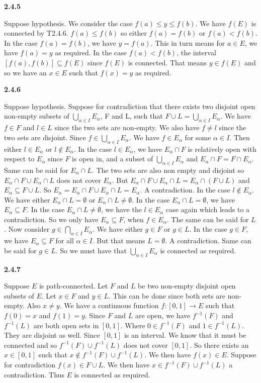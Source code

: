 \documentclass[12pt]{article}
\begin{document}
\textbf{2.4.5}

Suppose hypothesis. We consider the case $f(a) \leq y \leq f(b)$. We have $ f(E)$ is connected by T2.4.6. $f(a) \leq f(b)$ so either $f(a) = f(b)$ or $f(a) < f(b)$. In the case $f(a) = f(b)$, we have $y = f(a)$. This in turn means for $a\in E$, we have $f(a) =y$ as required. In the case $f(a) < f(b)$, the interval $[f(a), f(b)]\subseteq f(E)$ since $f(E)$ is connected. That means $y\in f(E)$ and so we have an $x\in E$ such that $f(x) = y$ as required. 

\textbf{2.4.6}

Suppose hypothesis. Suppose for contradiction that there exists two disjoint open non-empty subsets of $\bigcup_{\alpha\in I}E_\alpha$, F and L, such that $F\cup L=\bigcup_{\alpha\in I}E_\alpha$. We have $f\in F$ and $l\in L$ since the two sets are non-empty. We also have $f\neq l$ since the two sets are disjoint. Since $f\in \bigcup_{\alpha\in I}E_\alpha$. We have $f\in E_\alpha$ for some $\alpha \in I$. Then either $l\in  E_\alpha$ or $l\notin E_\alpha$. In the case $l\in E_\alpha$, we have $ E_\alpha\cap F$ is relatively open with respect to $E_\alpha$ since $F$ is open in, and a subset of $\bigcup_{\alpha\in I}E_\alpha$ and $E_\alpha\cap F = F\cap E_\alpha$. Same can be said for $ E_\alpha \cap L$. The two sets are also non empty and disjoint so $E_\alpha\cap F \cup E_\alpha \cap L$ does not cover $E_\alpha$. But $E_\alpha\cap F \cup E_\alpha \cap L = E_\alpha\cap (F\cup L)$ and $E_\alpha \subseteq F\cup L$. So $E_\alpha = E_\alpha\cap F \cup E_\alpha \cap L = E_\alpha $. A contradiction. In the case $ l\notin E_\alpha$. We have either $E_\alpha \cap L= \emptyset$ or $E_\alpha \cap L\neq\emptyset$. In the case $E_\alpha \cap L= \emptyset$, we have $ E_\alpha \subseteq F$. In the case $E_\alpha \cap L\neq\emptyset$, we have the $l\in E_\alpha$ case again which leads to a contradiction. So we only have $E_\alpha\subseteq F$, when $f\in E_\alpha$. The same can be said for $L$. Now consider $g\in \bigcap_{\alpha\in I}E_\alpha$. We have either $g\in F$ or $g\in L$. In the case $g\in F$, we have $E_\alpha \subseteq F$ for all $\alpha \in I$. But that means $L =\emptyset$. A contradiction. Same can be said for $g\in L$. So we must have that $\bigcup_{\alpha\in I}E_\alpha$ is connected as required. 

\textbf{2.4.7}

Suppose $E$ is path-connected. Let $F$ and $L$ be two non-empty disjoint open subsets of $E$. Let $x\in F$ and $y\in L$. This can be done since both sets are non-empty. Also $x\neq y$. We have a continuous function $f: [0,1]\to E$ such that $f(0) = x$ and $f(1) = y$. Since $F$ and $L$ are open, we have $f^{-1}(F)$ and $f^{-1}(L)$ are both open sets in $[0,1]$. Where $0\in f^{-1}(F)$ and $1\in f^{-1}(L)$. They are disjoint as well. Since $[0,1]$ is an interval. We know that it must be connected and so $ f^{-1}(F)\cup f^{-1}(L) $ does not cover $[0,1]$. So there exists an $x\in[0,1] $ such that $x\notin f^{-1}(F)\cup f^{-1}(L)$. We then have $f(x)\in E$. Suppose for contradiction $f(x) \in F\cup L$. We then have $x\in f^{-1}(F)\cup f^{-1}(L)$ a contradiction. Thus $E$ is connected as required. 
\end{document}
